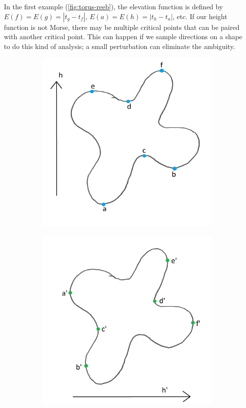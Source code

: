 \documentclass{article}
\begin{document}
In the first example (\cref{fig:torus-reeb}), the elevation function is defined by $E(f)=E(g)=|t_g-t_f|$, $E(a)=E(h)=|t_h-t_a|$, etc. If our height function is not Morse, there may be multiple critical points that can be paired with another critical point. This can happen if we sample directions on a shape to do this kind of analysis; a small perturbation can eliminate the ambiguity.

\begin{figure}
	\centering
	\begin{subfigure}{0.32\columnwidth}
		\centering
		\includegraphics[width=\textwidth]{fig/blobby-molecule-h-vertical}
	\end{subfigure}
	\begin{subfigure}{0.32\columnwidth}
		\centering
		\includegraphics[width=\textwidth]{fig/blobby-molecule-h-horizontal}

\end{subfigure}
\end{figure}
\end{document}
